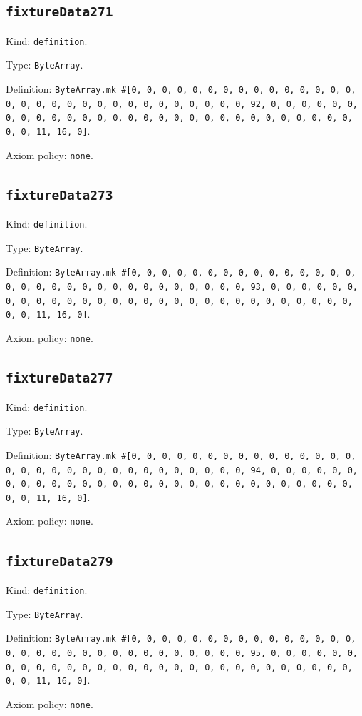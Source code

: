 \documentclass[11pt]{article}
\begin{document}
\subsection*{\texttt{fixtureData271}}
\noindent Kind: \texttt{definition}.\par
\noindent Type: \texttt{ByteArray}.\par
\noindent Definition: \texttt{ByteArray.mk \#[0, 0, 0, 0, 0, 0, 0, 0, 0, 0, 0, 0, 0, 0, 0, 0, 0, 0, 0, 0, 0, 0, 0, 0, 0, 0, 0, 0, 0, 0, 0, 92, 0, 0, 0, 0, 0, 0, 0, 0, 0, 0, 0, 0, 0, 0, 0, 0, 0, 0, 0, 0, 0, 0, 0, 0, 0, 0, 0, 0, 0, 0, 0, 11, 16, 0]}.\par
\noindent Axiom policy: \texttt{none}.\par
\subsection*{\texttt{fixtureData273}}
\noindent Kind: \texttt{definition}.\par
\noindent Type: \texttt{ByteArray}.\par
\noindent Definition: \texttt{ByteArray.mk \#[0, 0, 0, 0, 0, 0, 0, 0, 0, 0, 0, 0, 0, 0, 0, 0, 0, 0, 0, 0, 0, 0, 0, 0, 0, 0, 0, 0, 0, 0, 0, 93, 0, 0, 0, 0, 0, 0, 0, 0, 0, 0, 0, 0, 0, 0, 0, 0, 0, 0, 0, 0, 0, 0, 0, 0, 0, 0, 0, 0, 0, 0, 0, 11, 16, 0]}.\par
\noindent Axiom policy: \texttt{none}.\par
\subsection*{\texttt{fixtureData277}}
\noindent Kind: \texttt{definition}.\par
\noindent Type: \texttt{ByteArray}.\par
\noindent Definition: \texttt{ByteArray.mk \#[0, 0, 0, 0, 0, 0, 0, 0, 0, 0, 0, 0, 0, 0, 0, 0, 0, 0, 0, 0, 0, 0, 0, 0, 0, 0, 0, 0, 0, 0, 0, 94, 0, 0, 0, 0, 0, 0, 0, 0, 0, 0, 0, 0, 0, 0, 0, 0, 0, 0, 0, 0, 0, 0, 0, 0, 0, 0, 0, 0, 0, 0, 0, 11, 16, 0]}.\par
\noindent Axiom policy: \texttt{none}.\par
\subsection*{\texttt{fixtureData279}}
\noindent Kind: \texttt{definition}.\par
\noindent Type: \texttt{ByteArray}.\par
\noindent Definition: \texttt{ByteArray.mk \#[0, 0, 0, 0, 0, 0, 0, 0, 0, 0, 0, 0, 0, 0, 0, 0, 0, 0, 0, 0, 0, 0, 0, 0, 0, 0, 0, 0, 0, 0, 0, 95, 0, 0, 0, 0, 0, 0, 0, 0, 0, 0, 0, 0, 0, 0, 0, 0, 0, 0, 0, 0, 0, 0, 0, 0, 0, 0, 0, 0, 0, 0, 0, 11, 16, 0]}.\par
\noindent Axiom policy: \texttt{none}.\par
\end{document}

